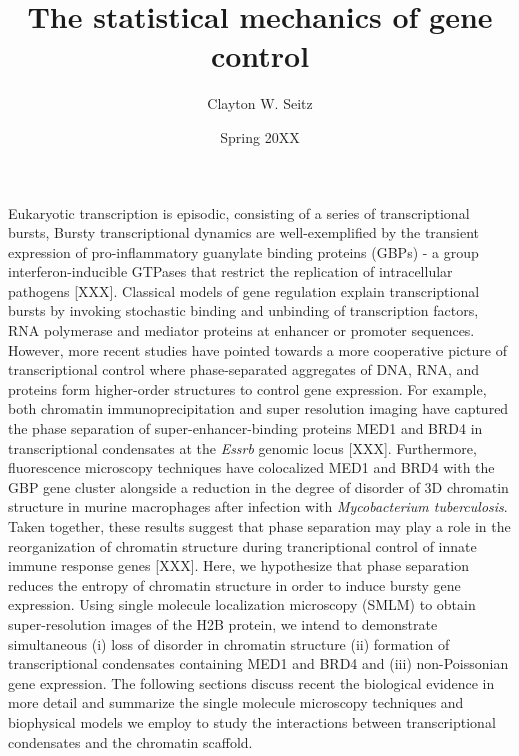 \documentclass{ucetd}
\title{The statistical mechanics of gene control}
\author{Clayton W. Seitz}
\date{Spring 20XX}
\begin{document}
\maketitle

\makecopyright


\tableofcontents


\abstract

Eukaryotic transcription is episodic, consisting of a series of transcriptional bursts, Bursty transcriptional dynamics are well-exemplified by the transient expression of pro-inflammatory guanylate binding proteins (GBPs) - a group interferon-inducible GTPases that restrict the replication of intracellular pathogens [XXX]. Classical models of gene regulation explain transcriptional bursts by invoking stochastic binding and unbinding of transcription factors, RNA polymerase and mediator proteins at enhancer or promoter sequences. However, more recent studies have pointed towards a more cooperative picture of transcriptional control where phase-separated aggregates of DNA, RNA, and proteins form higher-order structures to control gene expression. For example, both chromatin immunoprecipitation and super resolution imaging have captured the phase separation of super-enhancer-binding proteins MED1 and BRD4 in transcriptional condensates at the \textit{Essrb} genomic locus [XXX]. Furthermore, fluorescence microscopy techniques have colocalized MED1 and BRD4 with the GBP gene cluster alongside a reduction in the degree of disorder of 3D chromatin structure in murine macrophages after infection with \textit{Mycobacterium tuberculosis}. Taken together, these results suggest that phase separation may play a role in the reorganization of chromatin structure during trancriptional control of innate immune response genes [XXX]. Here, we hypothesize that phase separation reduces the entropy of chromatin structure in order to induce bursty gene expression. Using single molecule localization microscopy (SMLM) to obtain super-resolution images of the H2B protein, we intend to demonstrate simultaneous (i) loss of disorder in chromatin structure (ii) formation of transcriptional condensates containing MED1 and BRD4 and (iii) non-Poissonian gene expression. The following sections discuss recent the biological evidence in more detail and summarize the single molecule microscopy techniques and biophysical models we employ to study the interactions between transcriptional condensates and the chromatin scaffold.
\end{document}

